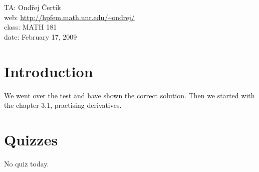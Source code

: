 \documentclass[10pt]{article}
\begin{document}
\noindent TA: Ondřej Čertík\\
web: \url{http://hpfem.math.unr.edu/~ondrej/}\\
class: MATH 181\\
date: February 17, 2009

\section{Introduction}

We went over the test and have shown the correct solution. Then we started with
the chapter 3.1, practising derivatives.

\section{Quizzes}

No quiz today.
\end{document}
